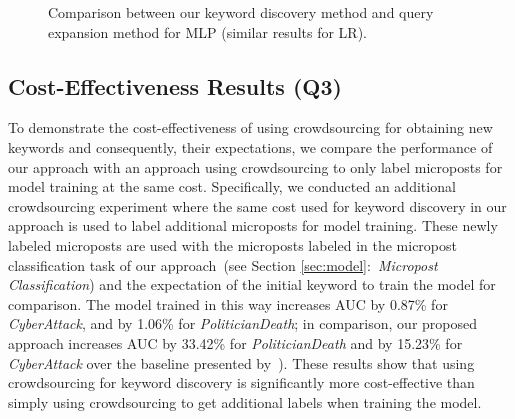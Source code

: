\documentclass[letterpaper]{article}
\begin{document}
\begin{figure}[t!]
        \centering
        \caption{Comparison between our keyword discovery method and query expansion method for MLP (similar results for LR).}
        \label{fig:Q2}
\end{figure}

\subsection{Cost-Effectiveness Results (Q3)}
To demonstrate the cost-effectiveness of using crowdsourcing for obtaining new keywords and consequently, their expectations, we compare the performance of our approach with an approach using crowdsourcing to only label microposts for model training at the same cost.
Specifically, we conducted an additional crowdsourcing experiment where the same cost used for keyword discovery in our approach is used to label additional microposts for model training.
These newly labeled microposts are used with the microposts labeled in the micropost classification task of our approach~(see Section \ref{sec:model}:~\emph{Micropost Classification}) and the expectation of the initial keyword to train the model for comparison. %
The model trained in this way increases AUC by 0.87\% for \emph{CyberAttack}, and by 1.06\% for \emph{PoliticianDeath}; in comparison, our proposed approach increases AUC by 33.42\% for \emph{PoliticianDeath} and by 15.23\% for \emph{CyberAttack} over the baseline presented by~\citeauthor{ritter2015weakly}).
These results show that using crowdsourcing for keyword discovery is significantly more cost-effective than simply using crowdsourcing to get additional labels when training the model.
\end{document}
